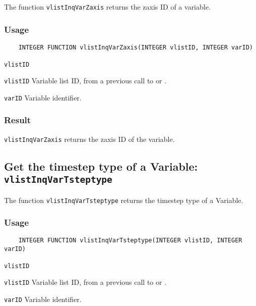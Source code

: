 The function {\texttt{vlistInqVarZaxis}} returns the zaxis ID of a variable.

\subsubsection*{Usage}

\begin{verbatim}
    INTEGER FUNCTION vlistInqVarZaxis(INTEGER vlistID, INTEGER varID)
\end{verbatim}

\hspace*{4mm}\begin{minipage}[]{15cm}
\begin{deflist}{\texttt{vlistID}\ }
\item[\texttt{vlistID}]
Variable list ID, from a previous call to {} or {}.
\item[\texttt{varID}]
Variable identifier.

\end{deflist}
\end{minipage}

\subsubsection*{Result}

{\texttt{vlistInqVarZaxis}} returns the zaxis ID of the variable.



\subsection{Get the timestep type of a Variable: \texttt{vlistInqVarTsteptype}}
\label{vlistInqVarTsteptype}

The function {\texttt{vlistInqVarTsteptype}} returns the timestep type of a Variable.

\subsubsection*{Usage}

\begin{verbatim}
    INTEGER FUNCTION vlistInqVarTsteptype(INTEGER vlistID, INTEGER varID)
\end{verbatim}

\hspace*{4mm}\begin{minipage}[]{15cm}
\begin{deflist}{\texttt{vlistID}\ }
\item[\texttt{vlistID}]
Variable list ID, from a previous call to {} or {}.
\item[\texttt{varID}]
Variable identifier.

\end{deflist}
\end{minipage}

